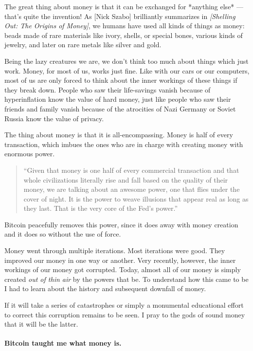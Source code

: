 The great thing about money is that it can be exchanged for *anything
else* --- that's quite the invention! As [Nick Szabo] brilliantly
summarizes in \textit{[Shelling Out: The Origins of Money]}, we humans have
used all kinds of things as money: beads made of rare materials like
ivory, shells, or special bones, various kinds of jewelry, and later on
rare metals like silver and gold.

Being the lazy creatures we are, we don't think too much about things
which just work. Money, for most of us, works just fine. Like with our
cars or our computers, most of us are only forced to think about the
inner workings of these things if they break down. People who saw their
life-savings vanish because of hyperinflation know the value of hard
money, just like people who saw their friends and family vanish because
of the atrocities of Nazi Germany or Soviet Russia know the value of
privacy.

The thing about money is that it is all-encompassing. Money is half of
every transaction, which imbues the ones who are in charge with creating
money with enormous power.

\begin{quotation}
``Given that money is one half of every commercial transaction and that
whole civilizations literally rise and fall based on the quality of
their money, we are talking about an awesome power, one that flies
under the cover of night. It is the power to weave illusions that
appear real as long as they last. That is the very core of the
Fed's power.''
\end{quotation}

Bitcoin peacefully removes this power, since it does away with money
creation and it does so without the use of force.

Money went through multiple iterations. Most iterations were good. They
improved our money in one way or another. Very recently, however, the
inner workings of our money got corrupted. Today, almost all of our
money is simply created \textit{out of thin air} by the powers that be. To
understand how this came to be I had to learn about the history and
subsequent downfall of money.

If it will take a series of catastrophes or simply a monumental
educational effort to correct this corruption remains to be seen. I pray
to the gods of sound money that it will be the latter.

\paragraph{Bitcoin taught me what money is.}

